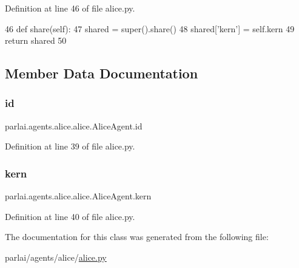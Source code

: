 Definition at line 46 of file alice.\+py.


\begin{DoxyCode}
46     \textcolor{keyword}{def }share(self):
47         shared = super().share()
48         shared[\textcolor{stringliteral}{'kern'}] = self.kern
49         \textcolor{keywordflow}{return} shared
50 
\end{DoxyCode}


\subsection{Member Data Documentation}
\mbox{\label{classparlai_1_1agents_1_1alice_1_1alice_1_1AliceAgent_a14ed30ca08dfb78e858174421e42d980}} 
\subsubsection{\texorpdfstring{id}{id}}
{\footnotesize\ttfamily parlai.\+agents.\+alice.\+alice.\+Alice\+Agent.\+id}



Definition at line 39 of file alice.\+py.

\mbox{\label{classparlai_1_1agents_1_1alice_1_1alice_1_1AliceAgent_aba3ce3bff554b5b7ab236a7574a83348}} 
\subsubsection{\texorpdfstring{kern}{kern}}
{\footnotesize\ttfamily parlai.\+agents.\+alice.\+alice.\+Alice\+Agent.\+kern}



Definition at line 40 of file alice.\+py.



The documentation for this class was generated from the following file\+:\begin{DoxyCompactItemize}
\item 
parlai/agents/alice/\hyperlink{alice_8py}{alice.\+py}\end{DoxyCompactItemize}
